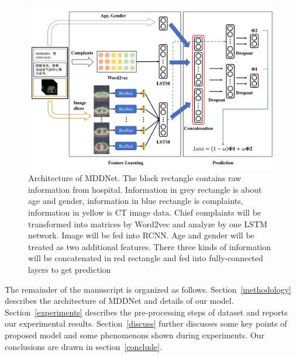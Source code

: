 \begin{figure}[t]
    \centerline{\includegraphics[width=160mm]{MMDD.pdf}}
    \vspace{-0cm}
    \caption{Architecture of MDDNet. The black rectangle contains raw information from hospital. Information in grey rectangle is about age and gender, information in blue rectangle is complaints, information in yellow is CT image data. Chief complaints will be transformed into matrices by Word2vec and analyze by one LSTM network. Image will be fed into RCNN. Age and gender will be treated as two additional features. There three kinds of information will be concatenated in red rectangle and fed into fully-connected layers to get prediction}
    \vspace{-0cm}
    \label{MMDD}
    \end{figure}


The remainder of the manuscript is organized as follows. 
Section~\ref{methodology} describes the architecture of MDDNet and details of our model.
Section~\ref{experiments} describes the pre-processing steps of dataset and reports our experimental results.
Section~\ref{discuss} further discusses some key points of proposed model and some phenomenons shown during experiments.
Our conclusions are drawn in section~\ref{conclude}.
